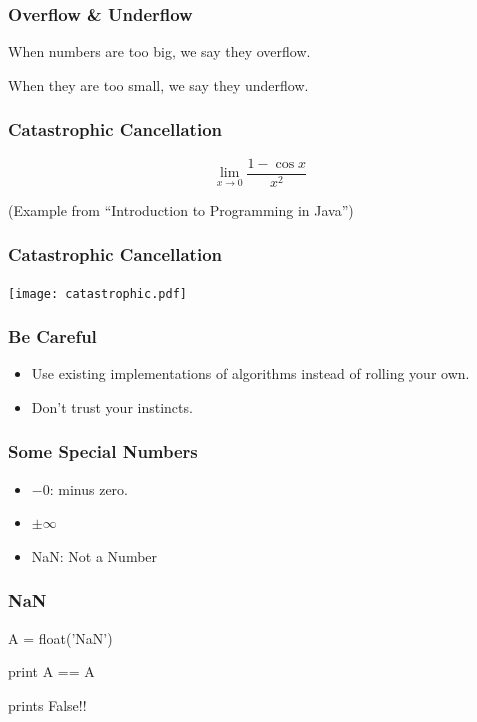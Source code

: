 \begin{frame}[fragile]
\frametitle{Overflow \& Underflow}

When numbers are too big, we say they \alert{overflow}.

When they are too small, we say they \alert{underflow}.
\end{frame}


\begin{frame}[fragile]
\frametitle{Catastrophic Cancellation}

\[
\lim_{x \to 0} \frac{1-\cos x}{x^2}
\]

\begin{flushright}
(Example from ``Introduction to Programming in Java'')
\end{flushright}
\end{frame}
\begin{frame}[fragile]
\frametitle{Catastrophic Cancellation}

\centering
\texttt{[image: catastrophic.pdf]}

\end{frame}

\begin{frame}[fragile]
\frametitle{Be Careful}

\begin{itemize}
\item Use existing implementations of algorithms instead of rolling your own.
\item Don't trust your instincts.
\end{itemize}
\end{frame}

\begin{frame}[fragile]
\frametitle{Some Special Numbers}

\begin{itemize}
\item $-0$: minus zero.
\item $\pm \infty$
\item NaN: Not a Number
\end{itemize}
\end{frame}

\begin{frame}[fragile]
\frametitle{NaN}
\begin{python}
A = float('NaN')

print A == A
\end{python}
prints \alert{False}!!

\end{frame}


